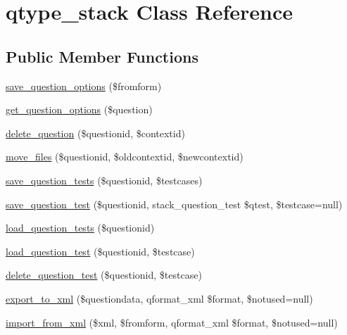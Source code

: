 \hypertarget{classqtype__stack}{
\section{qtype\_\-stack Class Reference}
\label{classqtype__stack}
}
\subsection*{Public Member Functions}
\begin{DoxyCompactItemize}
\item 
\hyperlink{classqtype__stack_aa2952c507edf5a94a04008d3280935c9}{save\_\-question\_\-options} (\$fromform)
\item 
\hyperlink{classqtype__stack_a36c0eb7d400874083182297c8e5674e7}{get\_\-question\_\-options} (\$question)
\item 
\hyperlink{classqtype__stack_a570cbcb256ddee98da84b592d0fb6b59}{delete\_\-question} (\$questionid, \$contextid)
\item 
\hyperlink{classqtype__stack_ab883061ceb86552af7d11117bd733235}{move\_\-files} (\$questionid, \$oldcontextid, \$newcontextid)
\item 
\hyperlink{classqtype__stack_a6a27f641cbeec3bfc2c36d914e3a59f4}{save\_\-question\_\-tests} (\$questionid, \$testcases)
\item 
\hyperlink{classqtype__stack_a9e5ff46bd0ed0ce2dad68b96b6362cc4}{save\_\-question\_\-test} (\$questionid, stack\_\-question\_\-test \$qtest, \$testcase=null)
\item 
\hyperlink{classqtype__stack_ab8695824b17f6c4f34c79027cfcfb1bf}{load\_\-question\_\-tests} (\$questionid)
\item 
\hyperlink{classqtype__stack_a3a3be570d5a183d63559b0e614166a39}{load\_\-question\_\-test} (\$questionid, \$testcase)
\item 
\hyperlink{classqtype__stack_a35926382f4b8e63b40132ac5fea4d33b}{delete\_\-question\_\-test} (\$questionid, \$testcase)
\item 
\hyperlink{classqtype__stack_abb4e2b1212e53ee6c4a36f2315d3e085}{export\_\-to\_\-xml} (\$questiondata, qformat\_\-xml \$format, \$notused=null)
\item 
\hyperlink{classqtype__stack_ab498c618fa8b907cab2cb841dbe2ace6}{import\_\-from\_\-xml} (\$xml, \$fromform, qformat\_\-xml \$format, \$notused=null)
\end{DoxyCompactItemize}
